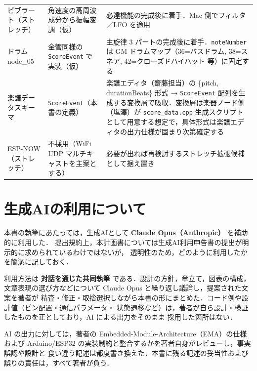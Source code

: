\documentclass[lualatex,book,paper=a4paper,jafontsize=11.5pt,jafontscale=1.05]{jlreq}
\begin{document}
\begin{longtable}{L{0.18\textwidth} L{0.34\textwidth} L{0.40\textwidth}}
ビブラート（ストレッチ）  & 角速度の高周波成分から振幅変調（仮）       & 必達機能の完成後に着手．Mac 側でフィルタ／LFO を適用 \\
ドラム node\_05         & 金管同様の \texttt{ScoreEvent} で実装（仮） & 主旋律 3 パートの完成後に着手．\texttt{noteNumber} は GM ドラムマップ（36=バスドラム, 38=スネア, 42=クローズドハイハット 等）に固定する \\
楽譜データスキーマ       & \texttt{ScoreEvent}（本書の定義）          & 楽譜エディタ（齋藤担当）の \{pitch, durationBeats\} 形式 → \texttt{ScoreEvent} 配列を生成する変換層で吸収．変換層は楽器ノード側（塩澤）が \texttt{score\_data.cpp} 生成スクリプトとして用意する想定で，具体形式は楽譜エディタの出力仕様が固まり次第確定する \\
ESP-NOW（ストレッチ）    & 不採用（WiFi UDP マルチキャストを主案とする） & 必要が出れば再検討するストレッチ拡張候補として据え置き \\
\bottomrule
\end{longtable}


\chapter{生成AIの利用について}\label{chap:ai-usage}

本書の執筆にあたっては，生成AIとして \textbf{Claude Opus（Anthropic）} を補助的に利用した．
提出規約上，本計画書については生成AI利用申告書の提出が明示的に求められているわけではないが，
透明性のため，どのように利用したかを簡潔に記しておく．

利用方法は \textbf{対話を通じた共同執筆} である．設計の方針，章立て，図表の構成，
文章表現の選び方などについて Claude Opus と繰り返し議論し，提案された文案を著者が
精査・修正・取捨選択しながら本書の形にまとめた．コード例や設計値（ピン配置・通信パラメータ・
状態遷移など）は，著者が自ら設計・検証したものを正としており，AI による出力をそのまま
採用した箇所はない．

AI の出力に対しては，著者の Embedded-Module-Architecture（EMA）の仕様および
Arduino/ESP32 の実装制約と整合するかを著者自身がレビューし，事実誤認や設計と
食い違う記述は都度書き換えた．本書に残る記述の妥当性および誤りの責任は，すべて著者が負う．
\end{document}
